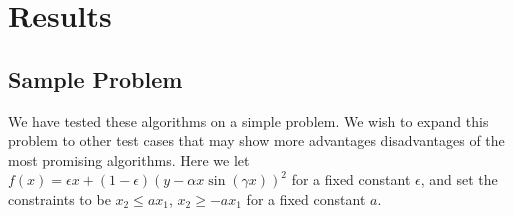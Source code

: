 

\section{Results}

\subsection{Sample Problem}
We have tested these algorithms on a simple problem.
We wish to expand this problem to other test cases that may show more advantages disadvantages of the most promising algorithms.
Here we let $f(x) = \epsilon x + (1-\epsilon)(y - \alpha x \sin(\gamma x))^2$ for a fixed constant $\epsilon$, and set the constraints to be
$x_2 \le ax_1$, $x_2 \ge -ax_1$ for a fixed constant $a$.

